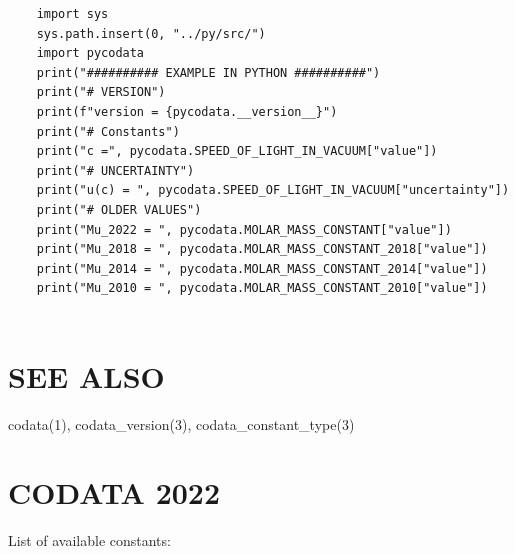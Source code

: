 \begin{verbatim}
    import sys
    sys.path.insert(0, "../py/src/")
    import pycodata
    print("########## EXAMPLE IN PYTHON ##########")
    print("# VERSION")
    print(f"version = {pycodata.__version__}")
    print("# Constants")
    print("c =", pycodata.SPEED_OF_LIGHT_IN_VACUUM["value"])
    print("# UNCERTAINTY")
    print("u(c) = ", pycodata.SPEED_OF_LIGHT_IN_VACUUM["uncertainty"])
    print("# OLDER VALUES")
    print("Mu_2022 = ", pycodata.MOLAR_MASS_CONSTANT["value"])
    print("Mu_2018 = ", pycodata.MOLAR_MASS_CONSTANT_2018["value"])
    print("Mu_2014 = ", pycodata.MOLAR_MASS_CONSTANT_2014["value"])
    print("Mu_2010 = ", pycodata.MOLAR_MASS_CONSTANT_2010["value"])


\end{verbatim}
\section*{SEE ALSO}
codata(1), codata\_version(3), codata\_constant\_type(3)

\section*{CODATA 2022}
List of available constants:

